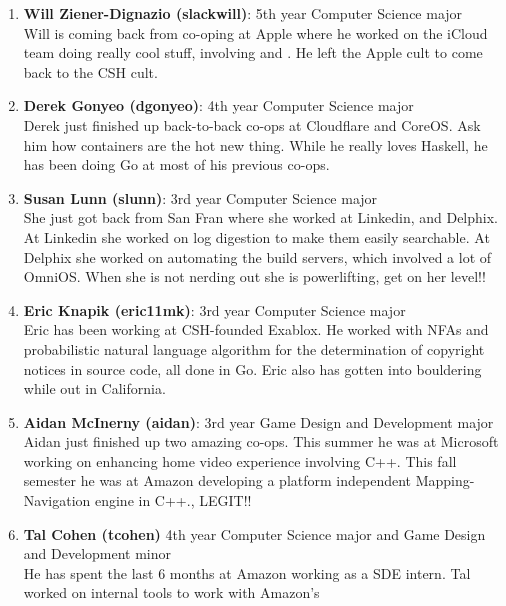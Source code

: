 \documentclass[9pt]{extarticle}
\begin{document}
\begin{enumerate}
\item \textbf{Will Ziener-Dignazio (slackwill)}: 5th year Computer Science major \\
	Will is coming back from co-oping at Apple where he worked on the iCloud team 
	doing really cool stuff, involving  and . He left the Apple cult to come back to the CSH cult.
\\
\item \textbf{Derek Gonyeo (dgonyeo)}: 4th year Computer Science major \\
	Derek just finished up back-to-back co-ops at Cloudflare and CoreOS. Ask 
	him how containers are the hot new thing. While he really loves Haskell, 
	he has been doing Go at most of his previous co-ops.
\\
\item \textbf{Susan Lunn (slunn)}: 3rd year Computer Science major \\
	She just got back from San Fran where she worked at Linkedin, and Delphix.
	At Linkedin she worked on log digestion to make them easily searchable. At
	Delphix she worked on automating the build servers, which involved a lot 
	of OmniOS. When she is not nerding out she is powerlifting, get on her 
	level!!
\\
\item \textbf{Eric Knapik (eric11mk)}: 3rd year Computer Science major \\
	Eric has been working at CSH-founded Exablox. He worked with NFAs and
	probabilistic natural language algorithm for the determination of 
	copyright notices in source code, all done in Go. Eric also has gotten into
	bouldering while out in California. 
\\
\item \textbf{Aidan McInerny (aidan)}: 3rd year Game Design and Development major \\
	Aidan just finished up two amazing co-ops. This summer he was
	at Microsoft working on enhancing home video experience involving C++. 
	This fall semester he was at Amazon developing a platform independent 
	Mapping-Navigation engine in C++., LEGIT!!
\\
\item \textbf{Tal Cohen (tcohen)} 4th year Computer Science major and Game Design and Development minor \\
	He has spent the last 6 months at Amazon
	working as a SDE intern. Tal worked on internal tools to work with Amazon's

\end{enumerate}
\end{document}
